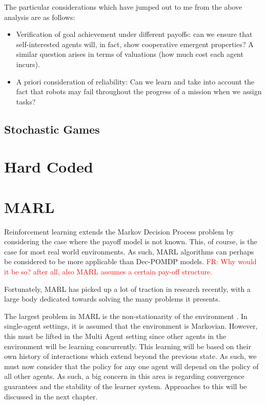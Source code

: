 \documentclass[preprint,11pt]{report}
\newcommand\fr[1]{\textcolor{red}{FR: #1}}
\begin{document}
The particular considerations which have jumped out to me from the above analysis are as follows:

\begin{itemize} 
	\item Verification of goal achievement under different payoffs: can we ensure that
	self-interested agents will, in fact, show cooperative emergent properties? A similar question
	arises in terms of valuations (how much cost each agent incurs). 
	\item A priori consideration of
	reliability: Can we learn and take into account the fact that robots may fail throughout the
	progress of a mission when we assign tasks? 
\end{itemize}

\subsection*{Stochastic Games}

\section{Hard Coded}

\section{MARL}

Reinforcement learning extends the Markov Decision Process problem by
considering the case where the payoff model is not known. This, of
course, is the case for most real world environments. As such, MARL
algorithms can perhaps be considered to be more applicable than
Dec-POMDP models.
\fr{Why would it be so? after all, also MARL assumes a certain pay-off structure.}

Fortunately, MARL has picked up a lot of traction in
research recently, with a large body dedicated towards solving the
many problems it presents.

The largest problem in MARL is the non-stationarity of the environment \cite{Hernandez-LealA}. In
single-agent settings, it is assumed that the environment is Markovian. However, this must be lifted
in the Multi Agent setting since other agents in the environment will be learning concurrently. This
learning will be based on their own history of interactions which extend beyond the previous state.
As such, we must now consider that the policy for any one agent will depend on the policy of all
other agents. As such, a big concern in this area is regarding convergence guarantees and the
stability of the learner system. Approaches to this will be discussed in the next chapter. 
\end{document}
